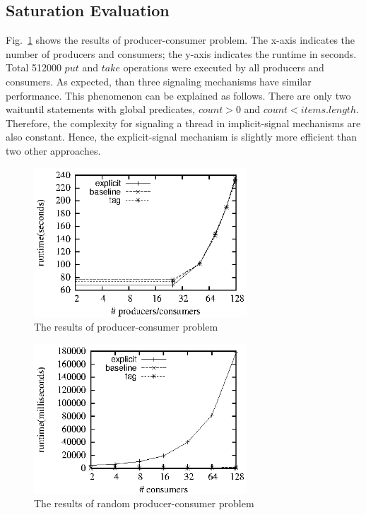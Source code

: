 \documentclass[preprint]{sigplanconf}
\begin{document}
\subsection{Saturation Evaluation}
Fig.~\ref{fig:pc_eval} shows the results of producer-consumer problem. The
x-axis indicates the number of producers and consumers; the y-axis indicates the
runtime in seconds. Total 512000 $put$ and $take$ operations were executed by
all producers and consumers. As expected, than three signaling mechanisms have 
similar performance. This phenomenon can be explained as follows. There are 
only two waituntil statements with global predicates, $count > 0$ and 
$count < items.length$. Therefore, the complexity for signaling a thread in
implicit-signal mechanisms are also constant. Hence, the explicit-signal
mechanism is slightly more efficient than two other approaches. 
\begin{figure}[ht!]
  \centering
  \includegraphics[width=80mm]{fig/pc.eps}
  \caption{The results of producer-consumer problem}
  \label{fig:pc_eval}
\end{figure}

\begin{figure}[ht!]
  \centering
  \includegraphics[width=80mm]{fig/rpc.eps}
  \caption{The results of random producer-consumer problem}
  \label{fig:rpc_eval}
\end{figure}
\end{document}
